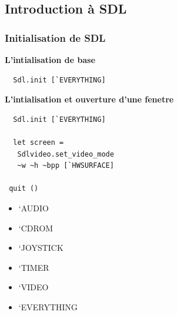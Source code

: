 \subsection{Introduction à SDL} %
\begin{frame}[fragile]
	\frametitle{Initialisation de SDL}
	\begin{minipage}{0.55\textwidth}
		\textbf{L'intialisation de base}
		\lstset{basicstyle=\small}
		\begin{lstlisting}
  Sdl.init [`EVERYTHING] 
		\end{lstlisting}
		\textbf{L'intialisation et ouverture d'une fenetre}
		\lstset{basicstyle=\small}
		\begin{lstlisting}
  Sdl.init [`EVERYTHING]

  let screen = 
   Sdlvideo.set_video_mode 
   ~w ~h ~bpp [`HWSURFACE]

 quit ()
		\end{lstlisting}
	\end{minipage}
	\begin{minipage}{0.4\textwidth}
		\begin{itemize}
			\item `AUDIO
			\item `CDROM
			\item `JOYSTICK
			\item `TIMER
			\item `VIDEO
		\end{itemize}
		\begin{itemize}
			\item `EVERYTHING
		\end{itemize}
	\end{minipage}
\end{frame}

